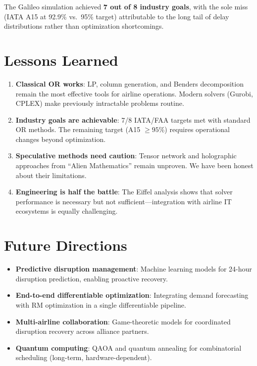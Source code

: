 \documentclass[11pt,a4paper]{book}
\theoremstyle{definition}
\begin{document}
The Galileo simulation achieved \textbf{7 out of 8 industry goals}, with
the sole miss (IATA A15 at 92.9\% vs.\ 95\% target) attributable to the
long tail of delay distributions rather than optimization shortcomings.

\section{Lessons Learned}

\begin{enumerate}
  \item \textbf{Classical OR works}: LP, column generation, and Benders
    decomposition remain the most effective tools for airline operations.
    Modern solvers (Gurobi, CPLEX) make previously intractable problems
    routine.

  \item \textbf{Industry goals are achievable}: 7/8 IATA/FAA targets met
    with standard OR methods. The remaining target (A15 $\geq 95\%$)
    requires operational changes beyond optimization.

  \item \textbf{Speculative methods need caution}: Tensor network and
    holographic approaches from ``Alien Mathematics'' remain unproven.
    We have been honest about their limitations.

  \item \textbf{Engineering is half the battle}: The Eiffel analysis shows
    that solver performance is necessary but not sufficient---integration
    with airline IT ecosystems is equally challenging.
\end{enumerate}

\section{Future Directions}

\begin{itemize}
  \item \textbf{Predictive disruption management}: Machine learning models
    for 24-hour disruption prediction, enabling proactive recovery.
  \item \textbf{End-to-end differentiable optimization}: Integrating demand
    forecasting with RM optimization in a single differentiable pipeline.
  \item \textbf{Multi-airline collaboration}: Game-theoretic models for
    coordinated disruption recovery across alliance partners.
  \item \textbf{Quantum computing}: QAOA and quantum annealing for
    combinatorial scheduling (long-term, hardware-dependent).
\end{itemize}
\end{document}
